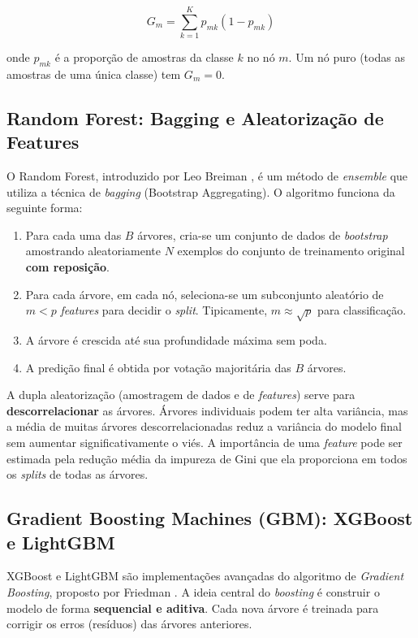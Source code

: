 \documentclass[12pt, a4paper, oneside]{report}
\begin{document}
\begin{equation}
    G_m = \sum_{k=1}^K p_{mk}(1 - p_{mk})
\end{equation}

onde $p_{mk}$ é a proporção de amostras da classe $k$ no nó $m$. Um nó puro (todas as amostras de uma única classe) tem $G_m = 0$.

\subsection{Random Forest: Bagging e Aleatorização de Features}

O Random Forest, introduzido por Leo Breiman \cite{breiman2001}, é um método de \textit{ensemble} que utiliza a técnica de \textit{bagging} (Bootstrap Aggregating). O algoritmo funciona da seguinte forma:

\begin{enumerate}
    \item Para cada uma das $B$ árvores, cria-se um conjunto de dados de \textit{bootstrap} amostrando aleatoriamente $N$ exemplos do conjunto de treinamento original \textbf{com reposição}.
    \item Para cada árvore, em cada nó, seleciona-se um subconjunto aleatório de $m < p$ \textit{features} para decidir o \textit{split}. Tipicamente, $m \approx \sqrt{p}$ para classificação.
    \item A árvore é crescida até sua profundidade máxima sem poda.
    \item A predição final é obtida por votação majoritária das $B$ árvores.
\end{enumerate}

A dupla aleatorização (amostragem de dados e de \textit{features}) serve para \textbf{descorrelacionar} as árvores. Árvores individuais podem ter alta variância, mas a média de muitas árvores descorrelacionadas reduz a variância do modelo final sem aumentar significativamente o viés. A importância de uma \textit{feature} pode ser estimada pela redução média da impureza de Gini que ela proporciona em todos os \textit{splits} de todas as árvores.

\subsection{Gradient Boosting Machines (GBM): XGBoost e LightGBM}

XGBoost e LightGBM são implementações avançadas do algoritmo de \textit{Gradient Boosting}, proposto por Friedman \cite{friedman2001}. A ideia central do \textit{boosting} é construir o modelo de forma \textbf{sequencial e aditiva}. Cada nova árvore é treinada para corrigir os erros (resíduos) das árvores anteriores.
\end{document}

